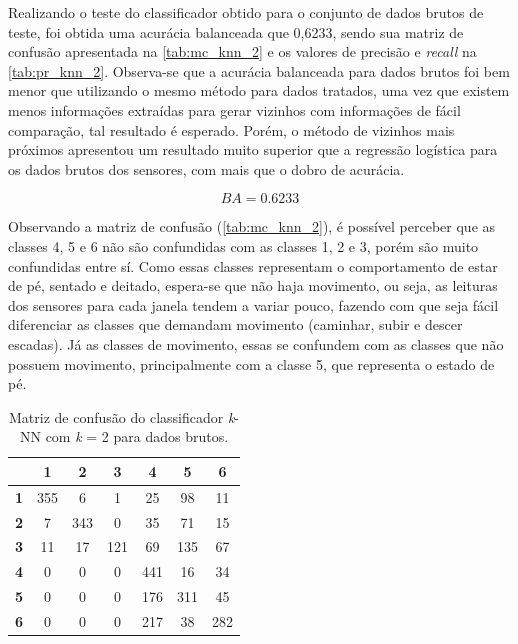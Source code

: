 Realizando o teste do classificador obtido para o conjunto de dados brutos de teste, foi obtida uma acurácia balanceada que 0,6233, sendo sua matriz de confusão apresentada na \autoref{tab:mc_knn_2} e os valores de precisão e \textit{recall} na \autoref{tab:pr_knn_2}. Observa-se que a acurácia balanceada para dados brutos foi bem menor que utilizando o mesmo método para dados tratados, uma vez que existem menos informações extraídas para gerar vizinhos com informações de fácil comparação, tal resultado é esperado. Porém, o método de vizinhos mais próximos apresentou um resultado muito superior que a regressão logística para os dados brutos dos sensores, com mais que o dobro de acurácia.

\begin{equation}
	BA = 0.6233
\end{equation}

Observando a matriz de confusão (\autoref{tab:mc_knn_2}), é possível perceber que as classes 4, 5 e 6 não são confundidas com as classes 1, 2 e 3, porém são muito confundidas entre sí. Como essas classes representam o comportamento de estar de pé, sentado e deitado, espera-se que não haja movimento, ou seja, as leituras dos sensores para cada janela tendem a variar pouco, fazendo com que seja fácil diferenciar as classes que demandam movimento (caminhar, subir e descer escadas). Já as classes de movimento, essas se confundem com as classes que não possuem movimento, principalmente com a classe 5, que representa o estado de pé.

\begin{table}[H]
	\centering
	\begin{tabular}{c||c|c|c|c|c|c|}\cline{2-7}
\textbf{}                        & \textbf{1} & \textbf{2} & \textbf{3} & \textbf{4} & \textbf{5} & \textbf{6} \\ \hline \hline
\multicolumn{1}{|c||}{\textbf{1}} & 355        & 6          & 1          & 25         & 98         & 11         \\ \hline
\multicolumn{1}{|c||}{\textbf{2}} & 7          & 343        & 0          & 35         & 71         & 15         \\ \hline
\multicolumn{1}{|c||}{\textbf{3}} & 11         & 17         & 121        & 69         & 135        & 67         \\ \hline
\multicolumn{1}{|c||}{\textbf{4}} & 0          & 0          & 0          & 441        & 16         & 34         \\ \hline
\multicolumn{1}{|c||}{\textbf{5}} & 0          & 0          & 0          & 176        & 311        & 45         \\ \hline
\multicolumn{1}{|c||}{\textbf{6}} & 0          & 0          & 0          & 217        & 38         & 282        \\ \hline
\end{tabular}
	\caption{Matriz de confusão do classificador \textit{k}-NN com \textit{k} = 2 para dados brutos.}
	\label{tab:mc_knn_2}
\end{table}

